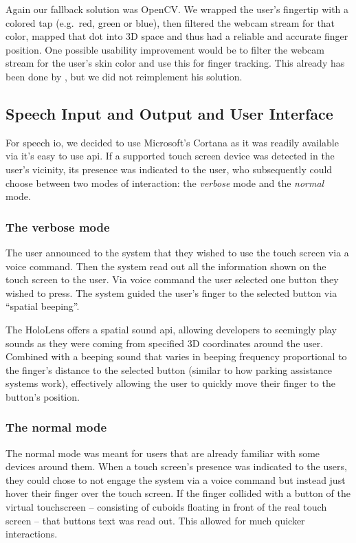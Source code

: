 Again our fallback solution was OpenCV.
We wrapped the user's fingertip with a colored tap (e.g.\ red, green or blue), then filtered the webcam stream for that color, mapped that dot into 3D space and thus had a reliable and accurate finger position.
One possible usability improvement would be to filter the webcam stream for the user's skin color and use this for finger tracking.
This already has been done by \textcite{fingertips}, but we did not reimplement his solution.


\subsection{Speech Input and Output and User Interface}
\label{subsec:ui}
\label{subsec:voiceio}
For speech \ac{io}, we decided to use Microsoft's Cortana as it was readily available via it's easy to use \ac{api}.
If a supported touch screen device was detected in the user's vicinity, its presence was indicated to the user, who subsequently could choose between two modes of interaction: the \emph{verbose} mode and the \emph{normal} mode.

\subsubsection{The verbose mode}
The user announced to the system that they wished to use the touch screen via a voice command.
Then the system read out all the information shown on the touch screen to the user.
Via voice command the user selected one button they wished to press.
The system guided the user's finger to the selected button via \enquote{spatial beeping}.

The HoloLens offers a spatial sound \ac{api}, allowing developers to seemingly play sounds as they were coming from specified 3D coordinates around the user.
Combined with a beeping sound that varies in beeping frequency proportional to the finger's distance to the selected button (similar to how parking assistance systems work), effectively allowing the user to quickly move their finger to the button's position.

\subsubsection{The normal mode}
The normal mode was meant for users that  are already familiar with some devices around them.
When a touch screen's presence was indicated to the users, they could chose to not engage the system via a voice command but instead just hover their finger over the touch screen.
If the finger collided with a button of the virtual touchscreen -- consisting of cuboids floating in front of the real touch screen -- that buttons text was read out.
This allowed for much quicker interactions.

